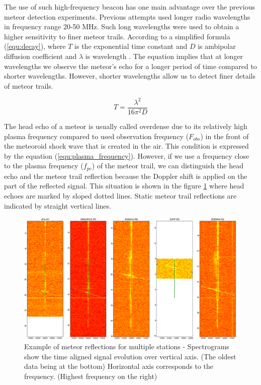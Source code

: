 \documentclass[twoside]{ctuthesis}
\theoremstyle{plain}
\theoremstyle{definition}
\theoremstyle{note}
\begin{document}
The use of such high-frequency beacon has one main advantage over the previous meteor detection experiments.
Previous attempts used longer radio wavelengths in frequency range 20-50 MHz. Such long wavelengths were used to obtain a higher sensitivity to finer meteor trails. According to a simplified formula (\ref{equ:decay}), where $T$ is the exponential time constant and $D$ is ambipolar diffusion coefficient and $\lambda$ is wavelength \cite{Decay_time}. The equation implies that at longer wavelengths we observe the meteor's echo for a longer period of time compared to shorter wavelengths. However, shorter wavelengths allow us to detect finer details of meteor trails.

\begin{equation}
T = \frac{\lambda^2}{16 \pi ^2 D}
\label{equ:decay}
\end{equation}

The head echo of a meteor is usually called overdense due to its relatively high plasma frequency compared to used observation frequency ($F_{obs}$) in the front of the meteoroid shock wave that is created in the air. This condition is expressed by the equation (\ref{equ:plasma_frequency}). However, if we use a frequency close to the plasma frequency ($f_{pe}$) of the meteor trail, we can distinguish the head echo and the meteor trail reflection because the Doppler shift is applied on the part of the reflected signal. This situation is shown in the figure \ref{fig:meteor_reflections} where head echoes are marked by sloped dotted lines. Static meteor trail reflections are indicated by straight vertical lines.

\begin{figure}
 \begin{center}
 \includegraphics[width=\textwidth]{./img/Raws_analyser.png}
 \caption{Example of meteor reflections for multiple stations - Spectrograms show the time aligned signal evolution over vertical axis. (The oldest data being at the bottom) Horizontal axis corresponds to the frequency. (Highest frequency on the right)}
  \label{fig:meteor_reflections} 
 \end{center}
\end{figure}
\end{document}

